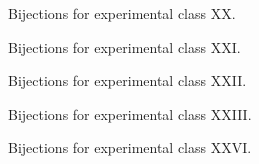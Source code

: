 \begin{figure}[ht!]
    \centering
    
    \caption{Bijections for experimental class XX.}
    \label{fig:expgrp_XX}
\end{figure}


\begin{figure}[ht!]
    \centering
    
    \caption{Bijections for experimental class XXI.}
    \label{fig:expgrp_XXI}
\end{figure}


\begin{figure}[ht!]
    \centering
    
    \caption{Bijections for experimental class XXII.}
    \label{fig:expgrp_XXII}
\end{figure}


\begin{figure}[ht!]
    \centering
    
    \caption{Bijections for experimental class XXIII.}
    \label{fig:expgrp_XXIII}
\end{figure}


\begin{comment}
\begin{figure}[ht!]
    \centering
    
    \caption{Bijections for experimental class XXIV.}
    \label{fig:expgrp_XXIV}
\end{figure}
\end{comment}


\begin{comment}
\begin{figure}[ht!]
    \centering
    
    \caption{Bijections for experimental class XXV.}
    \label{fig:expgrp_XXV}
\end{figure}
\end{comment}


\begin{figure}[ht!]
    \centering
    
    \caption{Bijections for experimental class XXVI.}
    \label{fig:expgrp_XXVI}
\end{figure}

